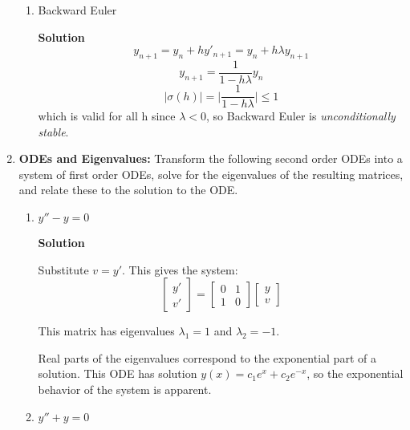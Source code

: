 \documentclass[letterpaper, fontsize=11pt]{scrartcl} %
\numberwithin{equation}{section} %
\numberwithin{figure}{section} %
\numberwithin{table}{section} %
\begin{document}
\begin{enumerate}
\begin{enumerate}
\item Backward Euler\par
\textbf{Solution} \newline
$$y_{n+1} = y_n + hy'_{n+1} = y_n + h\lambda y_{n+1} $$
$$y_{n+1} = \frac{1}{1 - h\lambda} y_n$$
$$|\sigma(h)| = \bigg|\frac{1}{1 - h\lambda}\bigg| \leq 1 $$
which is valid for all h since $\lambda < 0$, so Backward Euler is \textit{unconditionally stable}.
\end{enumerate}

\item \textbf{ODEs and Eigenvalues:} Transform the following second order ODEs into a system of first order ODEs, solve for the eigenvalues of the resulting matrices, and relate these to the solution to the ODE. 
\begin{enumerate}
\item $y'' - y = 0$ \par
\textbf{Solution} \newline
\par Substitute $v = y'$. This gives the system:
$$\left[ \begin{array}{c}
y' \\
v' \end{array} \right] = 
\left[
\begin{array}{cc} 0 & 1 \\ 1 & 0 \end{array} \right]
\left[ \begin{array}{c}
y \\
v \end{array} \right]$$
\par This matrix has eigenvalues $\lambda_1 = 1$ and $\lambda_2 = -1$. \par Real parts of the eigenvalues correspond to the exponential part of a solution. This ODE has solution $y(x) = c_1 e^x + c_2 e^{-x}$, so the exponential behavior of the system is apparent.

\item $y'' + y = 0$\par


\end{enumerate}
\end{enumerate}
\end{document}
